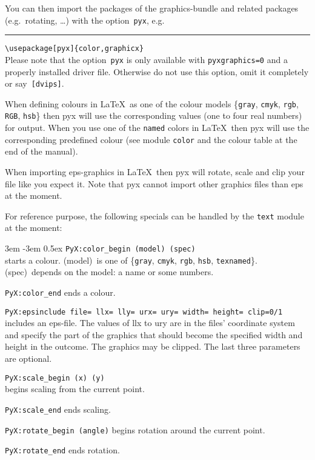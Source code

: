 You can then import the packages of the graphics-bundle and related packages
(e.g.~rotating, \ldots) with the option~\verb|pyx|, e.g.{}\\
\rule{0.1\linewidth}{0sp}\verb|\usepackage[pyx]{color,graphicx}|\\
Please note that the option~\verb|pyx| is only available with
\verb|pyxgraphics=0| and a properly installed driver file. Otherwise do not
use this option, omit it completely or say~\verb|[dvips]|.\medskip

When defining colours in \LaTeX\ as one of the colour models \{\verb|gray|,
\verb|cmyk|, \verb|rgb|, \verb|RGB|, \verb|hsb|\} then pyx will use the
corresponding values (one to four real numbers) for output. When you use one of the
\verb|named| colors in \LaTeX\ then pyx will use the corresponding predefined
colour (see module \verb|color| and the colour table at the end of the
manual).

When importing eps-graphics in \LaTeX\ then pyx will rotate, scale and clip
your file like you expect it. Note that pyx cannot import other graphics files
than eps at the moment.\medskip

For reference purpose, the following specials can be handled by the
\verb|text| module at the moment:\medskip

\begingroup
\leftskip3em
\parindent-3em
\parskip0.5ex
\texttt{PyX:color\_begin (model) (spec)}\\
  starts a colour. (model)~is one of
  \{\verb|gray|, \verb|cmyk|, \verb|rgb|, \verb|hsb|, \verb|texnamed|\}.
  (spec)~depends on the model: a name or some numbers.\par
\texttt{PyX:color\_end} ends a colour.\par
\texttt{PyX:epsinclude file= llx= lly= urx= ury= width= height= clip=0/1}\\
  includes an eps-file. The values of llx to ury are in the files' coordinate
  system and specify the part of the graphics that should become the specified
  width and height in the outcome. The graphics may be clipped. The last three
  parameters are optional.\par
\texttt{PyX:scale\_begin (x) (y)}\\
  begins scaling from the current point.\par
\texttt{PyX:scale\_end} ends scaling.\par
\texttt{PyX:rotate\_begin (angle)} begins rotation around the current
  point.\par
\texttt{PyX:rotate\_end} ends rotation.\par
\endgroup


